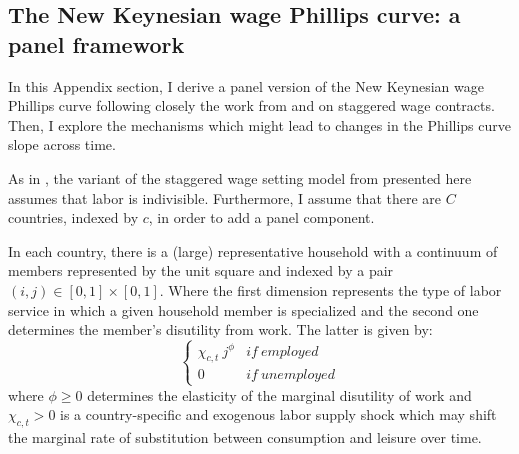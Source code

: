 \documentclass[12pt]{article}
\begin{document}
\begin{appendices}




\clearpage

\setcounter{table}{0}
\setcounter{figure}{0}
\setcounter{Equation}{0}

\section{The New Keynesian wage Phillips curve: a panel framework \label{S_Theory}}

In this Appendix section, I derive a panel version of the New Keynesian wage Phillips curve following closely the work from \cite{Gali2011} and \cite{Erceg2000} on staggered wage contracts. Then, I explore the mechanisms which might lead to changes in the Phillips curve slope across time.

As in \cite{Gali2011}, the variant of the staggered wage setting model from \cite{Erceg2000} presented here assumes that labor is indivisible. Furthermore, I assume that there are $C$ countries, indexed by $c$, in order to add a panel component.

In each country, there is a (large) representative household with a continuum of members represented by the unit square and indexed by a pair $(i,j) \in [0,1] \times [0,1]$. Where the first dimension represents the type of labor service in which a given household member is specialized and the second one determines the member's disutility from work. The latter is given by:
\[ 
\left\{
\begin{array}{ll}
      \chi_{c,t} \ j^{\phi} & if \ employed \\
      0 & if \ unemployed
\end{array} 
\right. 
\]
where $\phi \geq 0$ determines the elasticity of the marginal disutility of work and $\chi_{c,t} > 0$ is a country-specific and exogenous labor supply shock which may shift the marginal rate of substitution between consumption and leisure over time.


\end{appendices}
\end{document}
